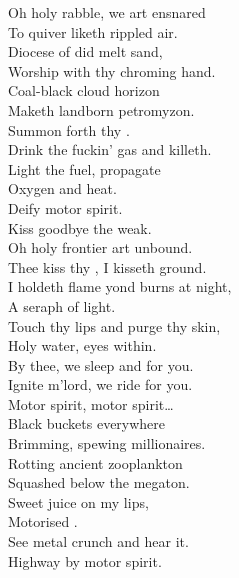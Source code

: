 
\label{album:petrodragonic-apocalypse}




Oh holy rabble, we art ensnared \\
To quiver liketh rippled air. \\
Diocese of did melt sand, \\
Worship with thy chroming hand. \\
Coal-black cloud horizon \\
Maketh landborn petromyzon. \\
Summon forth thy . \\
Drink the fuckin' gas and killeth. \\

Light the fuel, propagate \\
Oxygen and heat. \\
Deify motor spirit. \\
Kiss goodbye the weak. \\

Oh holy frontier art unbound. \\
Thee kiss thy , I kisseth ground. \\
I holdeth flame yond burns at night, \\
A seraph of  light. \\
Touch thy lips and purge thy skin, \\
Holy water, eyes within. \\
By thee, we sleep and  for you. \\
Ignite m'lord, we ride for you. \\

Motor spirit, motor spirit… \\

Black buckets everywhere \\
Brimming, spewing millionaires. \\
Rotting ancient zooplankton \\
Squashed below the megaton. \\
Sweet juice on my lips, \\
Motorised . \\
See metal crunch and hear it. \\
Highway  by motor spirit. \\

